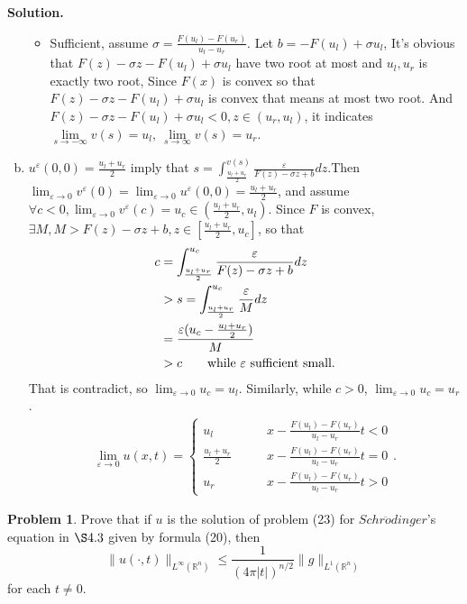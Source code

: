 \documentclass[a4paper]{book}
\newenvironment{solution}%
{\noindent\textbf{Solution.}}%
{\qedhere}
\numberwithin{equation}{chapter}
\theoremstyle{definition}
\newtheorem{pro}[exm]{Problem}
\begin{document}
\begin{solution}
\begin{enumerate}[(a)]
\begin{itemize}
      \item Sufficient, assume $\sigma = \frac{F(u_l) - F(u_r)}{u_l - u_r}$. Let $b = - F(u_l) + \sigma u_l$, It's obvious that $F(z) - \sigma z - F(u_l) + \sigma u_l$ have two root at most and $u_l,u_r$ is exactly two root, Since $F(x)$ is convex so that $F(z) - \sigma z - F(u_l) + \sigma u_l$ is convex that means at most two root. And $F(z) - \sigma z - F(u_l) + \sigma u_l < 0, z \in (u_r, u_l)$, it indicates $\lim\limits_{s \rightarrow - \infty} v(s) = u_l,\ \lim\limits_{s \rightarrow \infty} v(s) = u_r$.
      \end{itemize}
    \item $u^\varepsilon(0,0) = \frac{u_l+ u_r}{2}$ imply that $s = \int_{\frac{u_l + u_r}{2}}^{v(s)} \frac{\varepsilon}{F(z) - \sigma z + b}dz$.Then $\lim_{\varepsilon \rightarrow 0}v^\varepsilon(0) = \lim_{\varepsilon \rightarrow 0}u^\varepsilon(0,0) = \frac{u_l + u_r}{2}$, and assume $\forall c < 0 , \lim_{\varepsilon \rightarrow 0}v^\varepsilon(c) = u_c \in (\frac{u_l + u_r}{2}, u_l)$. Since $F$ is convex, $\exists M, M > F(z) - \sigma z + b, z \in [\frac{u_l + u_r}{2}, u_c]$, so that
      \begin{align*}
        c &= \int_{\frac{u_l + u_r}{2}}^{u_c} \frac{\varepsilon}{F(z) - \sigma z + b}dz \\
          &> s = \int_{\frac{u_l + u_r}{2}}^{u_c} \frac{\varepsilon}{M}dz \\
          &=\frac{\varepsilon(u_c - \frac{u_l + u_r}{2})}{M} \\
        &> c \qquad \textmd{while } \varepsilon \textmd{ sufficient small}. 
      \end{align*}
      That is contradict, so $\lim_{\varepsilon \rightarrow 0}u_c = u_l$. Similarly, while $c > 0$, $\lim_{\varepsilon \rightarrow 0}u_c = u_r$.
      \begin{align*}
        \lim_{\varepsilon \rightarrow 0}u(x,t) =
        \begin{cases}
          u_l   &\qquad x - \frac{F(u_l)- F(u_r)}{u_l - u_r} t < 0 \\
          \frac{u_l + u_r}{2}     &\qquad x - \frac{F(u_l)- F(u_r)}{u_l - u_r} t = 0 \\
          u_r   &\qquad x - \frac{F(u_l)- F(u_r)}{u_l - u_r} t > 0 
        \end{cases}.
      \end{align*}
  \end{enumerate}
\end{solution}

\begin{pro}
  Prove that if $u$ is the solution of problem (23) for $Schr\ddot{o}dinger$'s equation in $\S 4.3$ given by formula (20), then
  \[\lVert u(\cdot,t) \rVert_{L^\infty (\mathbb{R}^n)} \leq \frac{1}{(4 \pi \left| t \right|)^{n/2}} \lVert g \rVert_{L^1(\mathbb{R}^n)}\]
  for each $t \not= 0$.
\end{pro}
\end{document}
